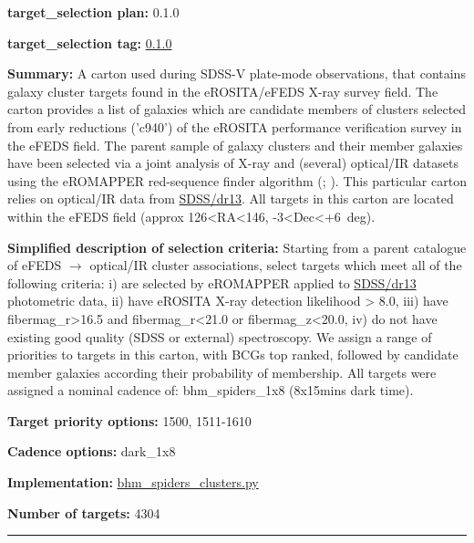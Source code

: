 \noindent\textbf{target\_selection plan:} 0.1.0

\noindent\textbf{target\_selection tag:}
\href{https://github.com/sdss/target_selection/tree/0.1.0/}{0.1.0}

\noindent\textbf{Summary:} A carton used during SDSS-V plate-mode observations,
that contains galaxy cluster targets found in the eROSITA/eFEDS X-ray
survey field. The carton provides a list of galaxies which are candidate
members of clusters selected from early reductions ('c940') of the
eROSITA performance verification survey in the eFEDS field. The parent
sample of galaxy clusters and their member galaxies have been selected
via a joint analysis of X-ray and (several) optical/IR datasets using
the eROMAPPER red-sequence finder algorithm
(\citealt{Rykoff2014};
\citealt{IderChitham2020}). This particular carton relies on optical/IR data
from \href{https://www.sdss.org/dr13/}{SDSS/dr13}. All targets in this
carton are located within the eFEDS field (approx
126\textless RA\textless146, -3\textless Dec\textless+6~deg).

\noindent\textbf{Simplified description of selection criteria:} Starting from a
parent catalogue of eFEDS $\rightarrow$ optical/IR cluster associations, select
targets which meet all of the following criteria: i) are selected by
eROMAPPER applied to \href{https://www.sdss.org/dr13/}{SDSS/dr13}
photometric data, ii) have eROSITA X-ray detection likelihood
\textgreater{} 8.0, iii) have fibermag\_r\textgreater16.5 and
fibermag\_r\textless21.0 or fibermag\_z\textless20.0, iv) do not have
existing good quality (SDSS or external) spectroscopy. We assign a range
of priorities to targets in this carton, with BCGs top ranked, followed
by candidate member galaxies according their probability of membership.
All targets were assigned a nominal cadence of: bhm\_spiders\_1x8
(8x15mins dark time).


\noindent\textbf{Target priority options:} 1500, 1511-1610

\noindent\textbf{Cadence options:} dark\_1x8

\noindent\textbf{Implementation:}
\href{https://github.com/sdss/target_selection/blob/0.1.0/python/target_selection/cartons/bhm_spiders_clusters.py}{bhm\_spiders\_clusters.py}

\noindent\textbf{Number of targets:} 4304

\begin{center}\rule{0.5\linewidth}{0.5pt}\end{center}


